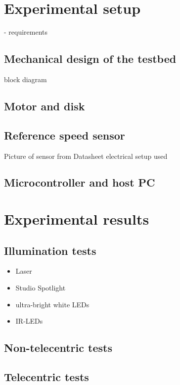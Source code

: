 \documentclass[12pt,a4paper]{article}
\begin{document}
\section{Experimental setup}

- requirements

\subsection{Mechanical design of the testbed}

block diagram

\subsection{Motor and disk}

\subsection{Reference speed sensor}
      Picture of sensor from Datasheet
      electrical setup used

\subsection{Microcontroller and host PC}      

\section{Experimental results}

\subsection{Illumination tests}

\begin{itemize}
  \item Laser
  \item Studio Spotlight
  \item ultra-bright white LEDs
  \item IR-LEDs
\end{itemize}

\subsection{Non-telecentric tests}

\subsection{Telecentric tests}
\end{document}
